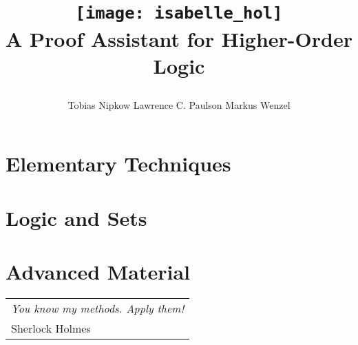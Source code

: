 \documentclass{article}
\begin{document}
\title{
\begin{center}
\texttt{[image: isabelle\_hol]}
       \\ \vspace{0.5cm} A Proof Assistant for Higher-Order Logic
\end{center}}
\author{Tobias Nipkow \quad Lawrence C. Paulson \quad Markus Wenzel%
}
\maketitle
\newpage




\tableofcontents

\cleardoublepage{}

\part{Elementary Techniques}




\part{Logic and Sets}




\part{Advanced Material}




\markboth{}{}
\cleardoublepage
\vspace*{\fill}
\begin{flushright}
\begin{tabular}{l}
{\large\sf\slshape You know my methods. Apply them!}\\[1ex]
Sherlock Holmes
\end{tabular}
\end{flushright}
\vspace*{\fill}
\vspace*{\fill}

\underscoreoff





\underscoreoff
\printindex
\end{document}
